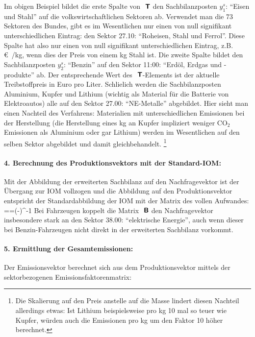 Im obigen Beispiel bildet die erste Spalte von ${\mbox{ \sf\textbf{T}}}$ den
Sachbilanzposten $y_1^s$: ``Eisen und
Stahl'' auf die volkswirtschaftlichen Sektoren ab. Verwendet man die
73 Sektoren des Bundes, gibt es im Wesentlichen nur einen von null
signifikant unterschiedlichen Eintrag: den Sektor 
 27.10: ``Roheisen, Stahl und Ferrol''. Diese Spalte hat also nur 
einen von null signifikant unterschiedlichen Eintrag,
z.B. \unit[3]{\euro{}/kg}, wenn dies der Preis von einem kg Stahl
ist.  Die zweite Spalte bildet den Sachbilanzposten $y_2^s$:
``Benzin'' auf den Sektor 11:00: ``Erd\"ol, Erdgas und
-produkte'' ab. Der entsprechende Wert des ${\mbox{ \sf\textbf{T}}}$-Elements ist der
aktuelle Treibstoffpreis in
Euro pro Liter. Schlie\3lich werden die Sachbilanzposten  Aluminium,
Kupfer und Lithium (wichtig als Material f\"ur die Batterie von
Elektroautos) alle auf den Sektor 27.00: ``NE-Metalle'' abgebildet. 
Hier sieht man einen Nachteil des Verfahrens: Materialien mit
unterschiedlichen Emissionen bei der Herstellung (die Herstellung
eines kg an Kupfer impliziert weniger CO$_2$ Emissionen als Aluminium
oder gar Lithium) werden im Wesentlichen auf den selben Sektor
abgebildet und damit gleichbehandelt. \footnote{Die Skalierung auf den
  Preis anstelle auf die Masse lindert diesen Nachteil allerdings
  etwas: Ist Lithium beispielsweise pro kg 10 mal so teuer wie Kupfer,
  w\"urden auch die Emissionen pro kg um den Faktor 10 h\"oher
  berechnet.}

\paragraph{4. Berechnung des Produktionsvektors mit der Standard-IOM:}

Mit der Abbildung  der erweiterten Sachbilanz auf den
Nachfragevektor ist der \"Ubergang zur IOM vollzogen und die Abbildung
auf den Produktionsvektor entspricht der Standardabbildung der IOM mit
der Matrix des vollen Aufwandes:
\bdm
{}==(-)^{-1} 
\edm
Bei Fahrzeugen koppelt die Matrix ${\mbox{ \sf\textbf{B}}}$ den Nachfragevektor insbesondere stark an
den Sektor 38.00: ``elektrische Energie'', auch wenn dieser bei
Benzin-Fahrzeugen nicht direkt in der erweiterten Sachbilanz vorkommt.

\paragraph{5. Ermittlung der Gesamtemissionen:}

Der Emissionsvektor berechnet sich aus dem Produktionsvektor mittels
der sektorbezogenen Emissionsfaktorenmatrix:

